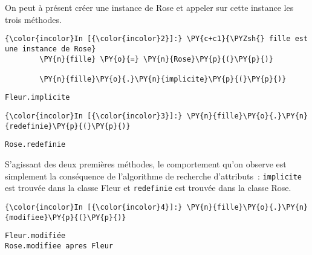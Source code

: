    On peut à présent créer une instance de Rose et appeler sur cette
instance les trois méthodes.

    \begin{Verbatim}[commandchars=\\\{\},frame=single,framerule=0.3mm,rulecolor=\color{cellframecolor}]
{\color{incolor}In [{\color{incolor}2}]:} \PY{c+c1}{\PYZsh{} fille est une instance de Rose}
        \PY{n}{fille} \PY{o}{=} \PY{n}{Rose}\PY{p}{(}\PY{p}{)}
        
        \PY{n}{fille}\PY{o}{.}\PY{n}{implicite}\PY{p}{(}\PY{p}{)}
\end{Verbatim}


    \begin{Verbatim}[commandchars=\\\{\},frame=single,framerule=0.3mm,rulecolor=\color{cellframecolor}]
Fleur.implicite
\end{Verbatim}

    \begin{Verbatim}[commandchars=\\\{\},frame=single,framerule=0.3mm,rulecolor=\color{cellframecolor}]
{\color{incolor}In [{\color{incolor}3}]:} \PY{n}{fille}\PY{o}{.}\PY{n}{redefinie}\PY{p}{(}\PY{p}{)}
\end{Verbatim}


    \begin{Verbatim}[commandchars=\\\{\},frame=single,framerule=0.3mm,rulecolor=\color{cellframecolor}]
Rose.redefinie
\end{Verbatim}

    S'agissant des deux premières méthodes, le comportement qu'on observe
est simplement la conséquence de l'algorithme de recherche d'attributs~:
\texttt{implicite} est trouvée dans la classe Fleur et
\texttt{redefinie} est trouvée dans la classe Rose.

    \begin{Verbatim}[commandchars=\\\{\},frame=single,framerule=0.3mm,rulecolor=\color{cellframecolor}]
{\color{incolor}In [{\color{incolor}4}]:} \PY{n}{fille}\PY{o}{.}\PY{n}{modifiee}\PY{p}{(}\PY{p}{)}
\end{Verbatim}


    \begin{Verbatim}[commandchars=\\\{\},frame=single,framerule=0.3mm,rulecolor=\color{cellframecolor}]
Fleur.modifiée
Rose.modifiee apres Fleur
\end{Verbatim}

